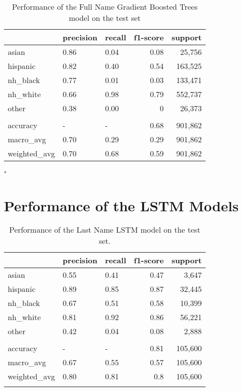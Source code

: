 \documentclass[12pt, letterpaper]{article}
\begin{document}
\begin{table}[h!]
\centering
\caption{Performance of the Full Name Gradient Boosted Trees model on the test set}
\begin{tabular}{lllrr}
\hline
              & precision   & recall   &   f1-score &   support \\
\hline
 asian        & 0.86        & 0.04     &       0.08 &     25,756 \\
 hispanic     & 0.82        & 0.40     &       0.54 &    163,525 \\
 nh\_black     & 0.77        & 0.01     &       0.03 &    133,471 \\
 nh\_white     & 0.66        & 0.98     &       0.79 &    552,737 \\
 other        & 0.38        & 0.00     &       0    &     26,373 \\
              &             &          &            &           \\
 accuracy     & -           & -        &       0.68 &    901,862 \\
 macro\_avg    & 0.70        & 0.29     &       0.29 &    901,862 \\
 weighted\_avg & 0.70        & 0.68     &       0.59 &    901,862 \\
\hline
\end{tabular}
\label{table:gb_full_name}
\end{table}

\singlespacing
\textsuperscript{*} 
\doublespacing

\clearpage
\section{Performance of the LSTM Models}\label{lstm_perf}

\begin{table}[h!]
\centering
\caption{Performance of the Last Name LSTM model on the test set.}
\begin{tabular}{lllrr}
\hline
              & precision   & recall   &   f1-score &   support \\
\hline
 asian        & 0.55        & 0.41     &       0.47 &      3,647 \\
 hispanic     & 0.89        & 0.85     &       0.87 &     32,445 \\
 nh\_black     & 0.67        & 0.51     &       0.58 &     10,399 \\
 nh\_white     & 0.81        & 0.92     &       0.86 &     56,221 \\
 other        & 0.42        & 0.04     &       0.08 &      2,888 \\
              &             &          &            &           \\
 accuracy     & -           & -        &       0.81 &    105,600 \\
 macro\_avg    & 0.67        & 0.55     &       0.57 &    105,600 \\
 weighted\_avg & 0.80        & 0.81     &       0.8  &    105,600 \\
\hline
\label{table:lstm_last_name}
\end{tabular}
\end{table}
\end{document}
